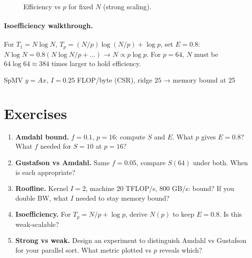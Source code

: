 \begin{figure}[h]\centering
{}
\caption{Efficiency vs $p$ for fixed $N$ (strong scaling).}
\label{fig:efficiency}
\end{figure}


\paragraph{Isoefficiency walkthrough.} For $T_1= N\log N$, $T_p= (N/p)\log(N/p)+\log p$, set $E=0.8$: $N\log N =0.8(N\log N/p + ...)$ → $N\propto p\log p$. For $p=64$, $N$ must be $64\log64\approx384$ times larger to hold efficiency.

\begin{example} SpMV $y=Ax$, $I=0.25$ FLOP/byte (CSR), ridge $25$ → memory bound at 25%
\end{example}



\section{Exercises}
\begin{enumerate}[label=E3.\arabic*, leftmargin=*, itemsep=0.6em]
    \item \textbf{Amdahl bound.} $f=0.1$, $p=16$: compute $S$ and $E$. What $p$ gives $E=0.8$? What $f$ needed for $S=10$ at $p=16$?
    \item \textbf{Gustafson vs Amdahl.} Same $f=0.05$, compare $S(64)$ under both. When is each appropriate?
    \item \textbf{Roofline.} Kernel $I=2$, machine 20 TFLOP/s, 800 GB/s: bound? If you double BW, what $I$ needed to stay memory bound?
    \item \textbf{Isoefficiency.} For $T_p=N/p+\log p$, derive $N(p)$ to keep $E=0.8$. Is this weak-scalable?
    \item \textbf{Strong vs weak.} Design an experiment to distinguish Amdahl vs Gustafson for your parallel sort. What metric plotted vs $p$ reveals which?
\end{enumerate}
